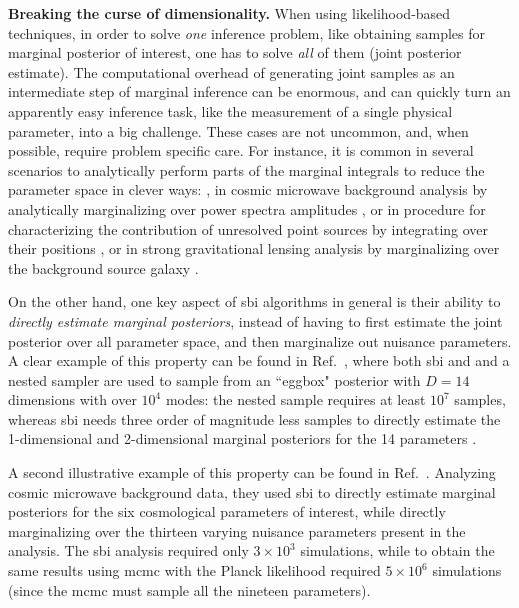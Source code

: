 \noindent \textbf{Breaking the curse of dimensionality.} When using likelihood-based techniques, in order to solve \emph{one} inference problem, like obtaining samples for marginal posterior of interest, one has to solve \emph{all} of them (joint posterior estimate). The computational overhead of generating joint samples as an intermediate step of marginal inference can be enormous, and can quickly turn an apparently easy inference task, like the measurement of a single physical parameter, into a big challenge. These cases are not uncommon, and, when possible, require problem specific care. For instance, it is common in several scenarios to analytically perform parts of the marginal integrals to reduce the parameter space in clever ways: \eg, in cosmic microwave background analysis by analytically marginalizing over power spectra amplitudes \cite{Gerbino:2019okg}, or in procedure for characterizing the contribution of unresolved point sources by integrating over their positions \cite{Mishra-Sharma:2016gis}, or in strong gravitational lensing analysis by marginalizing over the background source galaxy \cite{Vegetti:2008eg}.

On the other hand, one key aspect of \gls*{sbi} algorithms in general is their ability to \emph{directly estimate marginal posteriors}, instead of having to first estimate the joint posterior over all parameter space, and then marginalize out nuisance parameters. A clear example of this property can be found in Ref.~\cite{Miller:2020hua}, where both \gls*{sbi} and and a nested sampler are used to sample from an ``eggbox" posterior with $D=14$ dimensions with over $10^4$ modes: the nested sample requires at least $10^7$ samples, whereas \gls*{sbi} needs three order of magnitude less samples to directly estimate the 1-dimensional and 2-dimensional marginal posteriors for the 14 parameters \cite[Figure 2 in][]{Miller:2020hua}. 

A second illustrative example of this property can be found in Ref.~\cite{Cole:2021gwr}. Analyzing cosmic microwave background data, they used \gls*{sbi} to directly estimate marginal posteriors for the six cosmological parameters of interest, while directly marginalizing over the thirteen varying nuisance parameters present in the analysis. The \gls*{sbi} analysis required only $3\times10^3$ simulations, while to obtain the same results using \gls*{mcmc} with the Planck likelihood required $5\times10^6$ simulations (since the \gls*{mcmc} must sample all the nineteen parameters). 

